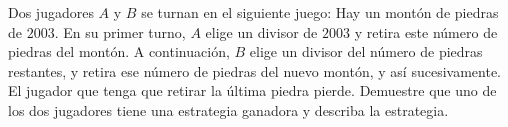 Dos jugadores $A$ y $B$ se turnan en el siguiente juego: Hay un montón de piedras de $2003$. En su primer turno, $A$ elige un divisor de $2003$ y retira este número de piedras del montón. A continuación, $B$ elige un divisor del número de piedras restantes, y retira ese número de piedras del nuevo montón, y así sucesivamente. El jugador que tenga que retirar la última piedra pierde. Demuestre que uno de los dos jugadores tiene una estrategia ganadora y describa la estrategia.
